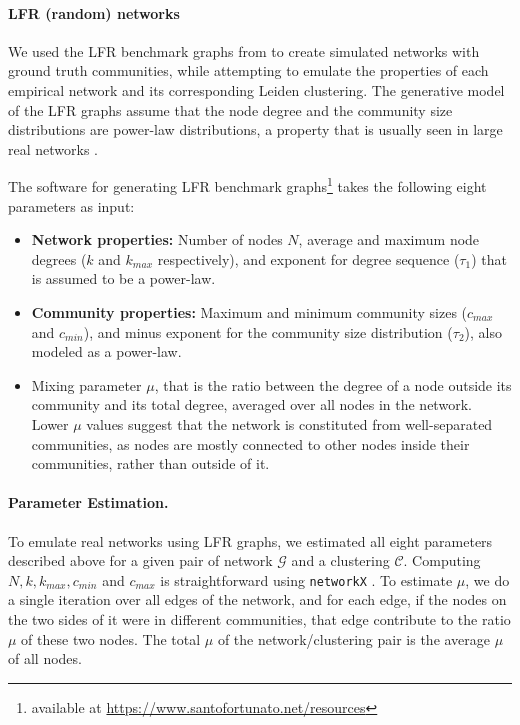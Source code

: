 \documentclass[11pt]{article}   	%
\begin{document}
\paragraph{LFR (random) networks}

We used the LFR benchmark graphs from \cite{lancichinetti2008benchmark} to create simulated networks with ground truth communities, while attempting to emulate the properties of each empirical network and its corresponding Leiden clustering. The generative model of the LFR graphs assume that the node degree and the community size distributions are power-law distributions, a property that is usually seen in large real networks \citep{albert2002statistical}.

The software for generating LFR benchmark graphs\footnote{available at \href{https://www.santofortunato.net/resources}{https://www.santofortunato.net/resources}} takes the following eight parameters as input:
\begin{itemize}
    \item  \textbf{Network properties:} Number of nodes $N$, average and maximum node degrees ($k$ and $k_{max}$ respectively), and exponent for degree sequence ($\tau_1$) that is assumed to be a power-law.
    \item \textbf{Community properties:} Maximum and minimum community sizes ($c_{max}$ and $c_{min}$), and minus exponent for the community size distribution ($\tau_2$), also modeled as a power-law.
    \item Mixing parameter $\mu$, that is the ratio between the degree of a node outside its community and its total degree, averaged over all nodes in the network. Lower $\mu$ values suggest that the network is constituted from well-separated communities, as nodes are mostly connected to other nodes inside their communities, rather than outside of it.
\end{itemize}






\paragraph{Parameter Estimation.} To emulate real networks using LFR graphs, we estimated all eight parameters described above for a given pair of network $\mathcal{G}$ and a clustering $\mathcal{C}$. Computing $N, k, k_{max}, c_{min}$ and $c_{max}$ is straightforward using \texttt{networkX} \citep{hagberg2008exploring}. To estimate $\mu$, we do a single iteration over all edges of the network, and for each edge, if the nodes on the two sides of it were in different communities, that edge contribute to the ratio $\mu$ of these two nodes. The total $\mu$ of the network/clustering pair is the average $\mu$ of all nodes.
\end{document}
